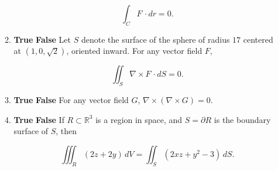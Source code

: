 \documentclass[12 pt]{report}
\begin{document}
\begin{enumerate}
\begin{enumerate}
\[
\int_C F \, \cdot dr = 0.
\]

\vfill

\item \textbf{True} \hspace{5pt} \textbf{False} \hspace{5pt} Let $S$ denote the surface of the sphere of radius $17$ centered at $(1,0, \sqrt{2})$, oriented inward. For any vector field $F$, 

\[ 
\iint_S \nabla \times F \, \cdot dS = 0.
\]

\vfill

\item \textbf{True} \hspace{5pt} \textbf{False} \hspace{5pt} For any vector field $G$, $\nabla \times (\nabla \times G) = 0$. 

\vfill

\item \textbf{True} \hspace{5pt} \textbf{False} \hspace{5pt} If $R \subset \mathbb{R}^3$ is a region in space, and $S = \partial R$ is the boundary surface of $S$, then 

\[
\iiint_R (2z + 2y) \, dV = \iint_S (2xz + y^2 - 3) \, dS.
\]
\vfill


\end{enumerate}

%
%

%
%
%
%
%
%
%
%
%
%
%
%
%
%


\end{enumerate}
\end{document}
